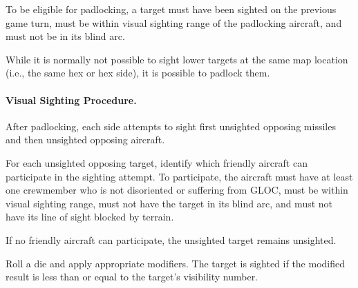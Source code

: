 {To be eligible for padlocking, a target must have been sighted on the previous game turn, must be within visual sighting range of the padlocking aircraft, and must not be in its blind arc. 

While it is normally not possible to sight lower targets at the same map location (i.e., the same hex or hex side), it is possible to padlock them.


\paragraph{Visual Sighting Procedure.}

After padlocking, each side attempts to sight first unsighted opposing missiles and then unsighted opposing aircraft.

For each unsighted opposing target, identify which friendly aircraft can participate in the sighting attempt. To participate, the aircraft must have at least one crewmember who is not disoriented or suffering from GLOC, must be within visual sighting range, must not have the target in its blind arc, and must not have its line of sight blocked by terrain. 

If no friendly aircraft can participate, the unsighted target remains unsighted.

 Roll a die and apply appropriate modifiers. The target is sighted if the modified result is less than or equal to the target's visibility number.


}



